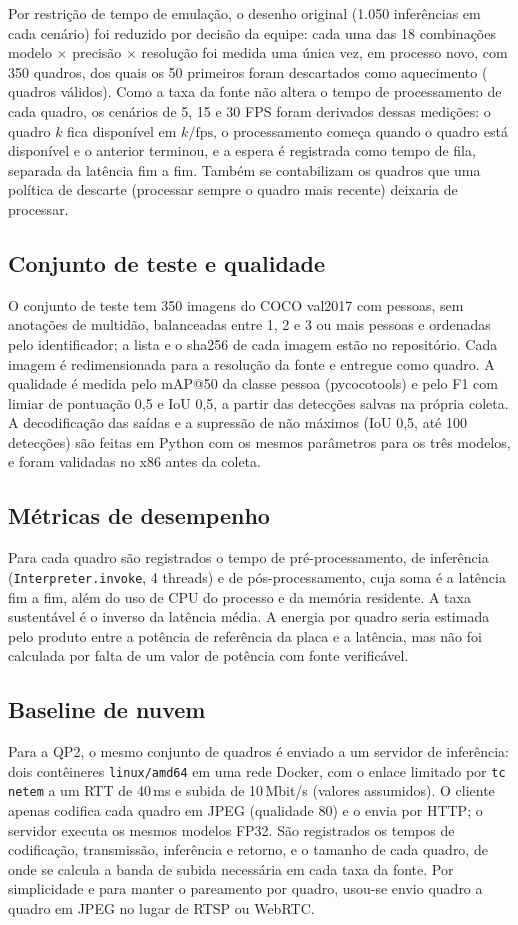 Por restrição de tempo de emulação, o desenho original (1.050 inferências em cada cenário) foi
reduzido por decisão da equipe: cada uma das 18 combinações modelo $\times$ precisão $\times$ resolução
foi medida uma única vez, em processo novo, com 350 quadros, dos quais os 50 primeiros foram
descartados como aquecimento (\nQuadrosValidos{} quadros válidos). Como a taxa da fonte não altera o
tempo de processamento de cada quadro, os cenários de 5, 15 e 30 FPS foram derivados dessas
medições: o quadro $k$ fica disponível em $k/\text{fps}$, o processamento começa quando o quadro está
disponível e o anterior terminou, e a espera é registrada como tempo de fila, separada da latência
fim a fim. Também se contabilizam os quadros que uma política de descarte (processar sempre o
quadro mais recente) deixaria de processar.

\subsection{Conjunto de teste e qualidade}
O conjunto de teste tem 350 imagens do COCO val2017 com pessoas, sem anotações de multidão,
balanceadas entre 1, 2 e 3 ou mais pessoas e ordenadas pelo identificador; a lista e o sha256 de cada
imagem estão no repositório. Cada imagem é redimensionada para a resolução da fonte e entregue como
quadro. A qualidade é medida pelo mAP@50 da classe pessoa (pycocotools) e pelo F1 com limiar de
pontuação 0,5 e IoU 0,5, a partir das detecções salvas na própria coleta. A decodificação das saídas
e a supressão de não máximos (IoU 0,5, até 100 detecções) são feitas em Python com os mesmos
parâmetros para os três modelos, e foram validadas no x86 antes da coleta.

\subsection{Métricas de desempenho}
Para cada quadro são registrados o tempo de pré-processamento, de inferência
(\texttt{Interpreter.invoke}, 4 threads) e de pós-processamento, cuja soma é a latência fim a fim, além
do uso de CPU do processo e da memória residente. A taxa sustentável é o inverso da latência média.
A energia por quadro seria estimada pelo produto entre a potência de referência da placa e a latência,
mas não foi calculada por falta de um valor de potência com fonte verificável.

\subsection{Baseline de nuvem}
Para a QP2, o mesmo conjunto de quadros é enviado a um servidor de inferência: dois contêineres
\texttt{linux/amd64} em uma rede Docker, com o enlace limitado por \texttt{tc netem} a um RTT de 40\,ms e
subida de 10\,Mbit/s (valores assumidos). O cliente apenas codifica cada quadro em JPEG (qualidade 80)
e o envia por HTTP; o servidor executa os mesmos modelos FP32. São registrados os tempos de
codificação, transmissão, inferência e retorno, e o tamanho de cada quadro, de onde se calcula a banda
de subida necessária em cada taxa da fonte. Por simplicidade e para manter o pareamento por quadro,
usou-se envio quadro a quadro em JPEG no lugar de RTSP ou WebRTC.

